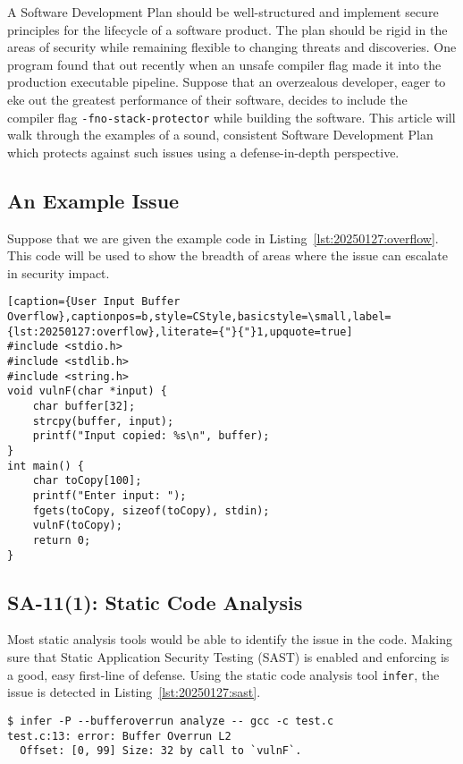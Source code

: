 A Software Development Plan should be well-structured and implement secure principles for the lifecycle of a software product. The plan should be rigid in the areas of security while remaining flexible to changing threats and discoveries. One program found that out recently when an unsafe compiler flag made it into the production executable pipeline. Suppose that an overzealous developer, eager to eke out the greatest performance of their software, decides to include the compiler flag \texttt{-fno-stack-protector} while building the software. This article will walk through the examples of a sound, consistent Software Development Plan which protects against such issues using a defense-in-depth perspective.

\subsection*{An Example Issue}
Suppose that we are given the example code in Listing~\ref{lst:20250127:overflow}. This code will be used to show the breadth of areas where the issue can escalate in security impact.

\begin{lstlisting}[caption={User Input Buffer Overflow},captionpos=b,style=CStyle,basicstyle=\small,label={lst:20250127:overflow},literate={"}{"}1,upquote=true]
#include <stdio.h>
#include <stdlib.h>
#include <string.h>
void vulnF(char *input) {
    char buffer[32];
    strcpy(buffer, input); 
    printf("Input copied: %s\n", buffer);
}
int main() {
    char toCopy[100]; 
    printf("Enter input: ");
    fgets(toCopy, sizeof(toCopy), stdin);
    vulnF(toCopy);
    return 0;
}
\end{lstlisting}

\subsection*{SA-11(1): Static Code Analysis}
Most static analysis tools would be able to identify the issue in the code. Making sure that Static Application Security Testing (SAST) is enabled and enforcing is a good, easy first-line of defense. Using the static code analysis tool \texttt{infer}, the issue is detected in Listing~\ref{lst:20250127:sast}.

\begin{lstlisting}[caption={SAST Detection of Buffer Overrun},captionpos=b,style=BashStyle,label={lst:20250127:sast}]
$ infer -P --bufferoverrun analyze -- gcc -c test.c
test.c:13: error: Buffer Overrun L2
  Offset: [0, 99] Size: 32 by call to `vulnF`.
\end{lstlisting}

